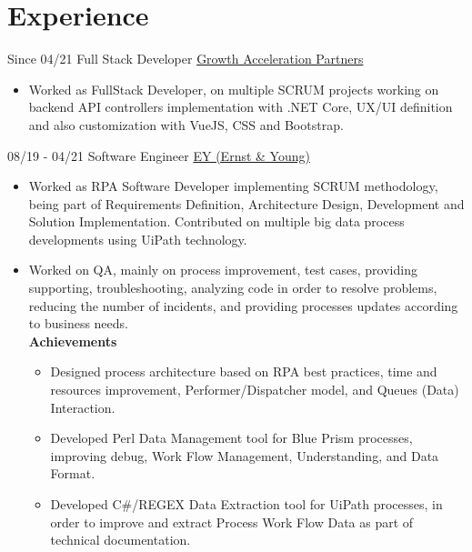 \documentclass[letterpaper]{twentysecondcv} %
\begin{document}
\section{Experience}
    \begin{twenty}
        \twentyitem
        {Since 04/21}
        {Full Stack Developer}
        { \href{https://www.growthaccelerationpartners.com/}{Growth Acceleration Partners}}
        {
            \begin{itemize}
                \item Worked as FullStack Developer, on multiple SCRUM projects working on backend  API controllers implementation with .NET Core, UX/UI definition and also customization with VueJS, CSS and Bootstrap.
            \end{itemize}
        }

	    \twentyitem
    	{08/19 - 04/21}
        {Software Engineer}
        { \href{https://www.ey.com/es_cr}{EY (Ernst \& Young)} }
        {
            \begin{itemize}
                \item Worked as RPA Software Developer implementing SCRUM methodology, being part of Requirements Definition, Architecture Design, Development and Solution Implementation. Contributed on multiple big data process developments using UiPath technology.
                
                \item Worked on QA, mainly on process improvement, test cases, providing supporting, troubleshooting, analyzing code in order to resolve problems, reducing the number of incidents, and providing processes updates according to business needs.\\
            
                \textbf{Achievements}
                \begin{itemize}
                    \item Designed process architecture based on RPA best practices, time and resources improvement, Performer/Dispatcher model, and Queues (Data) Interaction.
        
                    \item Developed Perl Data Management tool for Blue Prism processes, improving debug, Work Flow Management, Understanding, and Data Format.
        
                    \item Developed C\#/REGEX Data Extraction tool for UiPath processes, in order to improve and extract Process Work Flow Data as part of technical documentation.
        

\end{itemize}
\end{itemize}}
\end{twenty}
\end{document}
